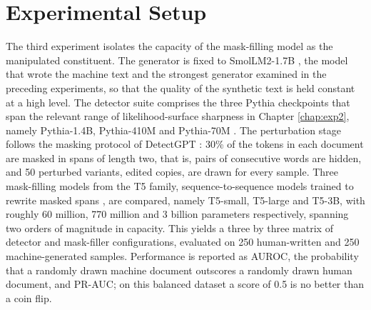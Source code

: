 \documentclass[logo,msc,cs]{infthesis}      %
\begin{document}
\section{Experimental Setup}
\label{sec:exp3_setup}
The third experiment isolates the capacity of the mask-filling model as the manipulated constituent. The generator is fixed to SmolLM2-1.7B \citep{allal2024smollm}, the model that wrote the machine text and the strongest generator examined in the preceding experiments, so that the quality of the synthetic text is held constant at a high level. The detector suite comprises the three Pythia checkpoints that span the relevant range of likelihood-surface sharpness in Chapter \ref{chap:exp2}, namely Pythia-1.4B, Pythia-410M and Pythia-70M \citep{biderman2023pythia}.
The perturbation stage follows the masking protocol of DetectGPT \citep{mitchell2023detectgpt}: 30\% of the tokens in each document are masked in spans of length two, that is, pairs of consecutive words are hidden, and 50 perturbed variants, edited copies, are drawn for every sample. Three mask-filling models from the T5 family, sequence-to-sequence models trained to rewrite masked spans \citep{raffel2020exploring}, are compared, namely T5-small, T5-large and T5-3B, with roughly 60 million, 770 million and 3 billion parameters respectively, spanning two orders of magnitude in capacity. This yields a three by three matrix of detector and mask-filler configurations, evaluated on 250 human-written and 250 machine-generated samples. Performance is reported as AUROC, the probability that a randomly drawn machine document outscores a randomly drawn human document, and PR-AUC; on this balanced dataset a score of 0.5 is no better than a coin flip.
\end{document}
